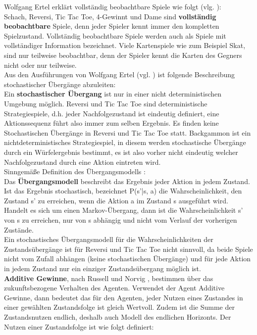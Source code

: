 Wolfgang Ertel erklärt vollständig beobachtbare Spiele wie folgt (vlg. \cite[114]{Ertel}):\\
Schach, Reversi, Tic Tac Toe, 4-Gewinnt und Dame sind \textbf{vollständig beobachtbare} Spiele, denn jeder Spieler kennt immer den kompletten Spielzustand. Vollständig beobachtbare Spiele werden auch als Spiele mit vollständiger Information bezeichnet. Viele Kartenspiele wie zum Beispiel Skat, sind nur teilweise beobachtbar, denn der Spieler kennt die Karten des Gegners nicht oder nur teilweise.\\

Aus den Ausführungen von Wolfgang Ertel (vgl. \cite[114]{Ertel}) ist folgende Beschreibung stochastischer Übergänge abzuleiten: \\
Ein \textbf{stochastischer Übergang} ist nur in einer nicht deterministischen Umgebung möglich. Reversi und Tic Tac Toe sind deterministische Strategiespiele, d.h. jeder Nachfolgezustand ist eindeutig definiert, eine Aktionssequenz führt also immer zum selben Ergebnis. Es finden keine Stochastischen Übergänge in Reversi und Tic Tac Toe statt. Backgammon ist ein nichtdeterministisches Strategiespiel, in diesem werden stochastische Übergänge durch ein Würfelergebnis bestimmt, es ist also vorher nicht eindeutig welcher Nachfolgezustand durch eine Aktion eintreten wird. \\

Sinngemäße Definition des Übergangsmodells \cite[753]{Russell}: \\
Das \textbf{Übergangsmodell} beschreibt das Ergebnis jeder Aktion in jedem Zustand. Ist das Ergebnis stochastisch, bezeichnet P(s'|s, a) die Wahrscheinlichkeit, den Zustand s' zu erreichen, wenn die Aktion a im Zustand s ausgeführt wird. Handelt es sich um einen Markov-Übergang, dann ist die Wahrscheinlichkeit s' von s zu erreichen, nur von s abhängig und nicht vom Verlauf der vorherigen Zustände. \\

Ein stochastisches Übergangsmodell für die Wahrscheinlichkeiten der Zustandsübergänge ist für Reversi und Tic Tac Toe nicht sinnvoll, da beide Spiele nicht vom Zufall abhängen (keine stochastischen Übergänge) und für jede Aktion in jedem Zustand nur ein einziger Zustandsübergang möglich ist. \\

\textbf{Additive Gewinne}, nach Russell und Norvig \cite[756]{Russell}, bestimmen über das zukunftsbezogene Verhalten des Agenten. Verwendet der Agent Additive Gewinne, dann bedeutet das für den Agenten, jeder Nutzen eines Zustandes in einer gewählten Zustandsfolge ist gleich Wertvoll. Zudem ist die Summe der Zustandsnutzen endlich, deshalb auch Modell des endlichen Horizonts. Der Nutzen einer Zustandsfolge ist wie folgt definiert: \\

